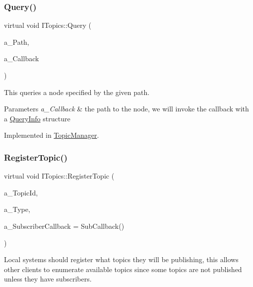 \subsubsection{\texorpdfstring{Query()}{Query()}}
{\footnotesize\ttfamily virtual void I\+Topics\+::\+Query (\begin{DoxyParamCaption}\item[{const std\+::string \&}]{a\+\_\+\+Path,  }\item[{Query\+Callback}]{a\+\_\+\+Callback }\end{DoxyParamCaption})\hspace{0.3cm}{\ttfamily [pure virtual]}}



This queries a node specified by the given path. 


\begin{DoxyParams}{Parameters}
{\em a\+\_\+\+Callback} & the path to the node, we will invoke the callback with a \hyperlink{struct_i_topics_1_1_query_info}{Query\+Info} structure \\
\hline
\end{DoxyParams}


Implemented in \hyperlink{class_topic_manager_a7b1d312d794d8876c0ea8592eb41a82b}{Topic\+Manager}.

\mbox{\label{class_i_topics_aaef29cbe6b8c089b22689a4ece3f711a}} 
\subsubsection{\texorpdfstring{Register\+Topic()}{RegisterTopic()}}
{\footnotesize\ttfamily virtual void I\+Topics\+::\+Register\+Topic (\begin{DoxyParamCaption}\item[{const std\+::string \&}]{a\+\_\+\+Topic\+Id,  }\item[{const std\+::string \&}]{a\+\_\+\+Type,  }\item[{Sub\+Callback}]{a\+\_\+\+Subscriber\+Callback = {\ttfamily SubCallback()} }\end{DoxyParamCaption})\hspace{0.3cm}{\ttfamily [pure virtual]}}

Local systems should register what topics they will be publishing, this allows other clients to enumerate available topics since some topics are not published unless they have subscribers. 

